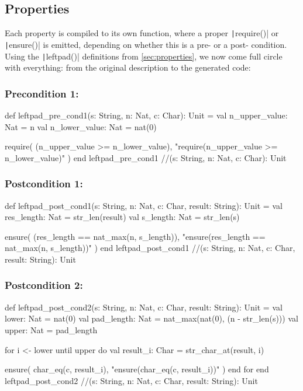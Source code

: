 \documentclass[11pt]{article}
\newcommand{\ScalaI}[1]{\texttt|#1|}
\begin{document}
\subsection{Properties}
Each property is compiled to its own function, where a proper 
\ScalaI{require()} or \ScalaI{ensure()} is emitted, depending on whether this 
is a pre- or a post- condition. Using the \ScalaI{leftpad()} definitions from 
\autoref{sec:properties}, we now come full circle with everything: from the 
original description to the generated code:

\subsubsection*{Precondition 1: \leftpadprea}
\begin{ScalaBlockSimple}
 def leftpad_pre_cond1(s: String, n: Nat, c: Char): Unit = 
  val n_upper_value: Nat = n
  val n_lower_value: Nat = nat(0)
  
  require(
    (n_upper_value >= n_lower_value),
    "require(n_upper_value >= n_lower_value)"
  )
end leftpad_pre_cond1 //(s: String, n: Nat, c: Char): Unit
\end{ScalaBlockSimple}


\subsubsection*{Postcondition 1: \leftpadposta}
\begin{ScalaBlockSimple}
def leftpad_post_cond1(s: String, n: Nat, c: Char, result: String): Unit = 
  val res_length: Nat = str_len(result)
  val s_length: Nat = str_len(s)
  
  ensure(
    (res_length == nat_max(n, s_length)),
    "ensure(res_length == nat_max(n, s_length))"
  )
end leftpad_post_cond1 //(s: String, n: Nat, c: Char, result: String): Unit
\end{ScalaBlockSimple}

\subsubsection*{Postcondition 2: \leftpadpostb}
\begin{ScalaBlockSimple}
def leftpad_post_cond2(s: String, n: Nat, c: Char, result: String): Unit = 
  val lower: Nat = nat(0)
  val pad_length: Nat = nat_max(nat(0), (n - str_len(s)))
  val upper: Nat = pad_length

  for i <- lower until upper do
    val result_i: Char = str_char_at(result, i)

    ensure(
      char_eq(c, result_i),
      "ensure(char_eq(c, result_i))"
    )
  end for
end leftpad_post_cond2 //(s: String, n: Nat, c: Char, result: String): Unit
\end{ScalaBlockSimple}
\end{document}
